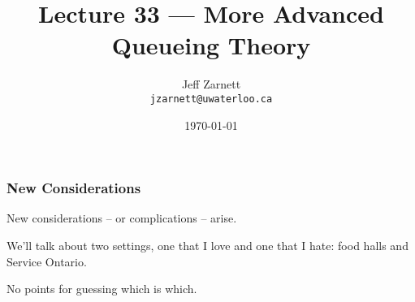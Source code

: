 

\title{Lecture 33 --- More Advanced Queueing Theory}

\author{Jeff Zarnett\\ \small \texttt{jzarnett@uwaterloo.ca}}
\date{\today}




\begin{frame}
  \titlepage

 \end{frame}


\begin{frame}
\frametitle{New Considerations}

New considerations -- or complications -- arise.

We'll talk about two settings, one that I love and one that I hate: food halls and Service Ontario. 
 
No points for guessing which is which.

\end{frame}








